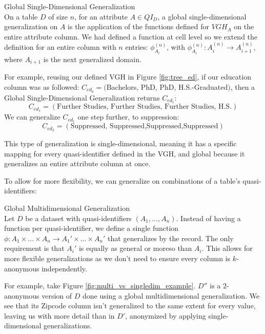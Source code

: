 \begin{definition}{Global Single-Dimensional Generalization} \\ 
On a table $D$ of size $n$, for an attribute $ A \in QI_D$, a global single-dimensional generalization on $A$ is the application of the functions defined for $VGH_A$ on the entire attribute column. We had defined a function at cell level so we extend the definition for an entire column with $n$ entries:  $\phi_{A_i}^{(n)}$, with $\phi_{A_i}^{(n)}: A_i^{(n)} \to A_{i+1}^{(n)}$, where $A_{i+1}$ is the next generalized domain. \cite{mondrian}

For example, reusing our defined VGH in Figure \ref{fig:tree_ed}, if our education column was as followed: $C_{ed_0} = ($Bachelors, PhD, PhD, H.S.-Graduated$)$, then a Global Single-Dimensional Generalization returns $C_{ed_1}$:
\[C_{ed_1} = (\text{Further Studies, Further Studies, Further Studies, H.S.})\]
We can generalize $C_{ed_1}$ one step further, to suppression:
\[C_{ed_2} = (\text{Suppressed, Suppressed,Suppressed,Suppressed})\]

This type of generalization is single-dimensional, meaning it has a specific mapping for every quasi-identifier defined in the VGH, and global because it generalizes an entire attribute column at once.
\end{definition}

To allow for more flexibility, we can generalize on combinations of a table's quasi-identifiers:
\begin{definition}{Global Multidimensional Generalization} \\ 
Let $D$ be a dataset with quasi-identifiers $(A_1,...,A_n)$. Instead of having a function per quasi-identifier, we define a single function $\phi: A_1 \times ... \times A_n \to A_1' \times ... \times A_n'$ that generalizes by the record. The only requirement is that $A_i'$ is equally as general or moreso than $A_i$. This allows for more flexible generalizations as we don't need to ensure every column is $k$-anonymous independently.

For example, take Figure \ref{fig:multi_vs_singledim_example}. $D''$ is a $2$-anonymous version of $D$ done using a global multidimensional generalization. We see that its Zipcode column isn't generalized to the same extent for every value, leaving us with more detail than in $D'$, anonymized by applying single-dimensional generalizations.
\end{definition}

